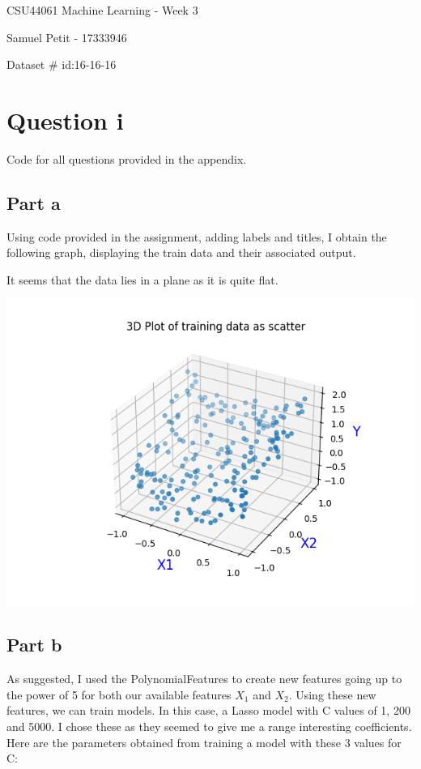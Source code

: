 \documentclass[10pt]{article}
\begin{document}
{\centering
    CSU44061 Machine Learning - Week 3
    \par
    Samuel Petit - 17333946
    \par
    Dataset \# id:16-16-16
    \par
}
\section*{Question i}
Code for all questions provided in the appendix.
\subsection*{Part a}
Using code provided in the assignment, adding labels and titles,
I obtain the following graph, displaying the train data and their associated
output.


It seems that the data lies in a plane as it is quite flat.

\begin{center}
    \includegraphics[scale=0.5]{Figure_1.png}
\end{center}


\subsection*{Part b}
As suggested, I used the PolynomialFeatures to create new features
going up to the power of 5 for both our available features $X_{1}$ and $X_{2}$.
Using these new features, we can train models. In this case, a Lasso model with
C values of 1, 200 and 5000. I chose these as they seemed to give me a range interesting
coefficients. Here are the parameters obtained from training a model with these 3 values for C:
\end{document}
